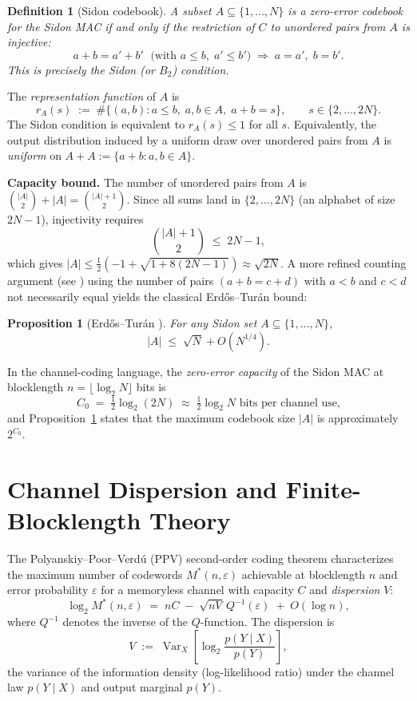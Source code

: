 \documentclass[12pt]{amsart}
\newtheorem{proposition}[theorem]{Proposition}
\newtheorem{definition}[theorem]{Definition}
\newcommand{\eps}{\varepsilon}
\newcommand{\Var}{\operatorname{Var}}
\newcommand{\sinv}{Q^{-1}}
\begin{document}
\begin{definition}[Sidon codebook]
A subset $A \subseteq \{1,\ldots,N\}$ is a \emph{zero-error codebook} for the
Sidon MAC if and only if the restriction of $C$ to unordered pairs from $A$ is
injective:
\[
   a + b = a' + b' \;\text{ (with } a \le b,\; a' \le b') \;\Longrightarrow\; a = a',\; b = b'.
\]
This is precisely the Sidon (or $B_2$) condition.
\end{definition}

The \emph{representation function} of $A$ is
\[
   r_A(s) \;:=\; \#\bigl\{(a,b) : a \le b,\; a, b \in A,\; a+b = s\bigr\},
   \qquad s \in \{2,\ldots,2N\}.
\]
The Sidon condition is equivalent to $r_A(s) \le 1$ for all $s$.  Equivalently,
the output distribution induced by a uniform draw over unordered pairs from $A$
is \emph{uniform} on $A + A := \{a + b : a, b \in A\}$.

\medskip
\noindent\textbf{Capacity bound.}
The number of unordered pairs from $A$ is $\binom{|A|}{2} + |A| =
\binom{|A|+1}{2}$.  Since all sums land in $\{2,\ldots,2N\}$ (an alphabet of
size $2N - 1$), injectivity requires
\[
   \binom{|A|+1}{2} \;\le\; 2N - 1,
\]
which gives $|A| \le \tfrac{1}{2}(-1 + \sqrt{1 + 8(2N-1)}) \approx
\sqrt{2N}$.  A more refined counting argument (see \cite{ET41}) using the
number of pairs $(a+b = c+d)$ with $a < b$ and $c < d$ not necessarily equal
yields the classical Erd\H{o}s--Tur\'{a}n bound:

\begin{proposition}[Erd\H{o}s--Tur\'{a}n \cite{ET41}]
\label{prop:et}
For any Sidon set $A \subseteq \{1,\ldots,N\}$,
\[
   |A| \;\le\; \sqrt{N} + O(N^{1/4}).
\]
\end{proposition}

In the channel-coding language, the \emph{zero-error capacity} of the Sidon
MAC at blocklength $n = \lfloor \log_2 N \rfloor$ bits is
\[
   C_0 \;=\; \tfrac{1}{2}\log_2(2N) \;\approx\; \tfrac{1}{2}\log_2 N \text{ bits per channel use,}
\]
and Proposition~\ref{prop:et} states that the maximum codebook size $|A|$ is
approximately $2^{C_0}$.

\section{Channel Dispersion and Finite-Blocklength Theory}
\label{sec:dispersion}

The Polyanskiy--Poor--Verd\'{u} (PPV) second-order coding theorem
\cite{PPV10} characterizes the maximum number of codewords $M^*(n,\eps)$
achievable at blocklength $n$ and error probability $\eps$ for a memoryless
channel with capacity $C$ and \emph{dispersion} $V$:
\begin{equation}
\label{eq:ppv}
   \log_2 M^*(n,\eps)
   \;=\; nC \;-\; \sqrt{nV}\,\sinv(\eps) \;+\; O(\log n),
\end{equation}
where $\sinv$ denotes the inverse of the $Q$-function.  The dispersion is
\[
   V \;:=\; \Var_X\!\left[\log_2 \frac{p(Y \mid X)}{p(Y)}\right],
\]
the variance of the information density (log-likelihood ratio) under the
channel law $p(Y \mid X)$ and output marginal $p(Y)$.
\end{document}
